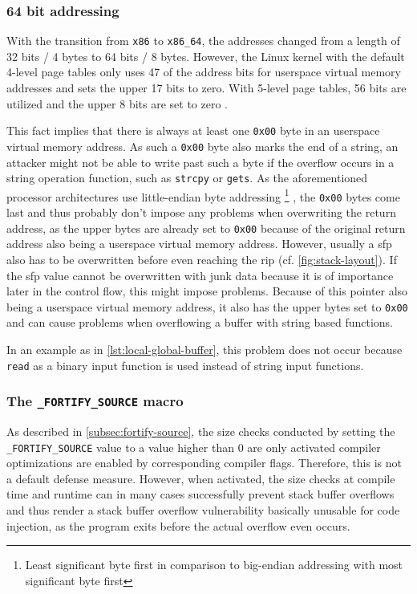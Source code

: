 \subsubsection{64 bit addressing}
\label{subsubsec:ci-64bit-addressing}

With the transition from \texttt{x86} to \texttt{x86\_64}, the addresses changed from a length of 32 bits / 4 bytes to 64 bits / 8 bytes.
However, the Linux kernel with the default 4-level page tables only uses 47 of the address bits for userspace virtual memory addresses and sets the upper 17 bits to zero.
With 5-level page tables, 56 bits are utilized and the upper 8 bits are set to zero \cite{Kernel2020}.

This fact implies that there is always at least one \texttt{0x00} byte in an userspace virtual memory address.
As such a \texttt{0x00} byte also marks the end of a string, an attacker might not be able to write past such a byte if the overflow occurs in a string operation function, such as \texttt{strcpy} or \texttt{gets}.
As the aforementioned processor architectures use little-endian byte addressing%
	\footnote{Least significant byte first in comparison to big-endian addressing with most significant byte first}%
, the \texttt{0x00} bytes come last and thus probably don't impose any problems when overwriting the return address, as the upper bytes are already set to \texttt{0x00} because of the original return address also being a userspace virtual memory address. 
However, usually a \gls{sfp} also has to be overwritten before even reaching the \gls{rip} (cf. \cref{fig:stack-layout}).
If the \gls{sfp} value cannot be overwritten with junk data because it is of importance later in the control flow, this might impose problems.
Because of this pointer also being a userspace virtual memory address, it also has the upper bytes set to \texttt{0x00} and can cause problems when overflowing a buffer with string based functions.

In an example as in \cref{lst:local-global-buffer}, this problem does not occur because \texttt{read} as a binary input function is used instead of string input functions.

\subsubsection{The \texttt{\_FORTIFY\_SOURCE} macro}
\label{subsubsec:ci-fortify-source}

As described in \cref{subsec:fortify-source}, the size checks conducted by setting the \texttt{\_FORTIFY\linebreak[0]\_SOURCE} value to a value higher than 0 are only activated compiler optimizations are enabled by corresponding compiler flags.
Therefore, this is not a default defense measure.
However, when activated, the size checks at compile time and runtime can in many cases successfully prevent stack buffer overflows and thus render a stack buffer overflow vulnerability basically unusable for code injection, as the program exits before the actual overflow even occurs.


